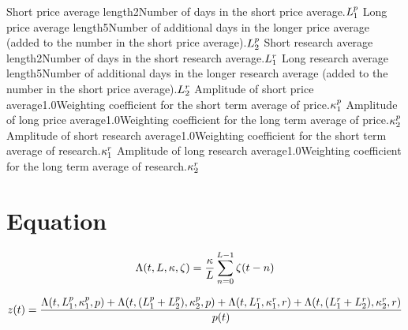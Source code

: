 \documentclass{article}
\begin{document}
\logo

\tblofcontents
{}

{Short price average length}{2}{Number of days in the short price
average.}{$L_{1}^{p}$}
{Long price average length}{5}{Number of additional days in the longer price average (added to the number in the short price average).}{$L_{2}^{p}$}
{Short research average length}{2}{Number of days in the short research average.}{$L_{1}^{r}$}
{Long research average length}{5}{Number of additional days in the longer research average (added to the number in the short price average).}{$L_{2}^{r}$}
{Amplitude of short price average}{1.0}{Weighting coefficient for the short term average of price.}{$\kappa_{1}^{p}$}
{Amplitude of long price average}{1.0}{Weighting coefficient for the long term average of price.}{$\kappa_{2}^{p}$}
{Amplitude of short research average}{1.0}{Weighting coefficient for the short term average of research.}{$\kappa_{1}^{r}$}
{Amplitude of long research average}{1.0}{Weighting coefficient for the long term average of research.}{$\kappa_{2}^{r}$}
\stoptable


\section{Equation}

\begin{equation}
\Lambda(t, L, \kappa, \zeta) = \frac{\kappa}{L} \sum_{n=0}^{L-1} \zeta(t - n)\\
\label{eq1}
\end{equation}

\begin{equation}
z(t) = \frac{\Lambda(t, L_{1}^{p}, \kappa_{1}^{p}, p)+\Lambda(t, (L_{1}^{p} + L_{2}^{p}), \kappa_{2}^{p},p)+\Lambda(t, L_{1}^{r}, \kappa_{1}^{r}, r)+\Lambda(t, (L_{1}^{r} + L_{2}^{r}), \kappa_{2}^{r}, r)}{p(t)} \\
\label{eq2}
\end{equation}
\end{document}
